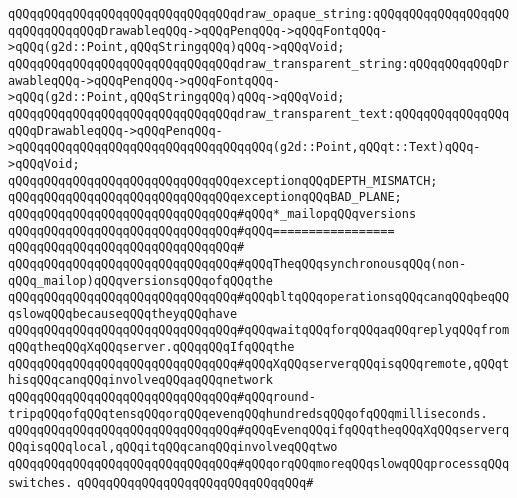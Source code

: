 \verb|qQQqqQQqqQQqqQQqqQQqqQQqqQQqqQQqdraw_opaque_string:qQQqqQQqqQQqqQQqqQQqqQQqqQQqqQQqDrawableqQQq->qQQqPenqQQq->qQQqFontqQQq->qQQq(g2d::Point,qQQqStringqQQq)qQQq->qQQqVoid;|\newline
\verb|qQQqqQQqqQQqqQQqqQQqqQQqqQQqqQQqdraw_transparent_string:qQQqqQQqqQQqDrawableqQQq->qQQqPenqQQq->qQQqFontqQQq->qQQq(g2d::Point,qQQqStringqQQq)qQQq->qQQqVoid;|\newline
\verb|qQQqqQQqqQQqqQQqqQQqqQQqqQQqqQQqdraw_transparent_text:qQQqqQQqqQQqqQQqqQQqDrawableqQQq->qQQqPenqQQq->qQQqqQQqqQQqqQQqqQQqqQQqqQQqqQQqqQQq(g2d::Point,qQQqt::Text)qQQq->qQQqVoid;|\newline
\newline
\newline
\newline
\newline
\verb|qQQqqQQqqQQqqQQqqQQqqQQqqQQqqQQqexceptionqQQqDEPTH_MISMATCH;|\newline
\verb|qQQqqQQqqQQqqQQqqQQqqQQqqQQqqQQqexceptionqQQqBAD_PLANE;|\newline
\newline
\verb|qQQqqQQqqQQqqQQqqQQqqQQqqQQqqQQq#qQQq*_mailopqQQqversions|\newline
\verb|qQQqqQQqqQQqqQQqqQQqqQQqqQQqqQQq#qQQq=================|\newline
\verb|qQQqqQQqqQQqqQQqqQQqqQQqqQQqqQQq#|\newline
\verb|qQQqqQQqqQQqqQQqqQQqqQQqqQQqqQQq#qQQqTheqQQqsynchronousqQQq(non-qQQq_mailop)qQQqversionsqQQqofqQQqthe|\newline
\verb|qQQqqQQqqQQqqQQqqQQqqQQqqQQqqQQq#qQQqbltqQQqoperationsqQQqcanqQQqbeqQQqslowqQQqbecauseqQQqtheyqQQqhave|\newline
\verb|qQQqqQQqqQQqqQQqqQQqqQQqqQQqqQQq#qQQqwaitqQQqforqQQqaqQQqreplyqQQqfromqQQqtheqQQqXqQQqserver.qQQqqQQqIfqQQqthe|\newline
\verb|qQQqqQQqqQQqqQQqqQQqqQQqqQQqqQQq#qQQqXqQQqserverqQQqisqQQqremote,qQQqthisqQQqcanqQQqinvolveqQQqaqQQqnetwork|\newline
\verb|qQQqqQQqqQQqqQQqqQQqqQQqqQQqqQQq#qQQqround-tripqQQqofqQQqtensqQQqorqQQqevenqQQqhundredsqQQqofqQQqmilliseconds.|\newline
\verb|qQQqqQQqqQQqqQQqqQQqqQQqqQQqqQQq#qQQqEvenqQQqifqQQqtheqQQqXqQQqserverqQQqisqQQqlocal,qQQqitqQQqcanqQQqinvolveqQQqtwo|\newline
\verb|qQQqqQQqqQQqqQQqqQQqqQQqqQQqqQQq#qQQqorqQQqmoreqQQqslowqQQqprocessqQQqswitches.|\newline
\verb|qQQqqQQqqQQqqQQqqQQqqQQqqQQqqQQq#|\newline
